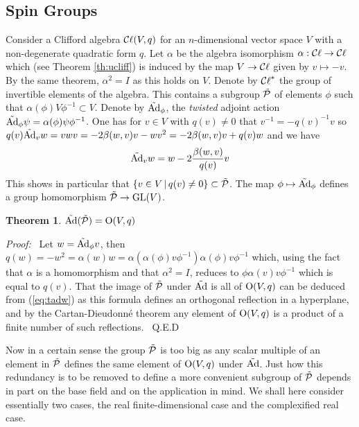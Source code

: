 \documentclass[12pt,titlepage]{article}
\def\cC{{\cal C}}
\def\cP{{\cal P}}
\def\Ad{\hbox{Ad}}
\def\Cl{{\cC\ell}}
\def\GL{\hbox{GL}}
\def\O{\hbox{O}}
\newtheorem{theorem}{Theorem}
\newenvironment{proof}{{\em Proof:\/}\ }{\ Q.E.D}
\begin{document}
\subsection{Spin Groups}\label{sec:spingroups}%

Consider a Clifford algebra \(\Cl(V,q)\) for an \(n\)-dimensional vector
space \(V\) with a non-degenerate quadratic form \(q\). 
Let \(\alpha\) be the algebra isomorphism \(\alpha:\Cl \to
\Cl\)
\index{\(\alpha\)}%
which (see Theorem \ref{th:ucliff})
is induced by the map \(V\to \Cl\) given by
\(v\mapsto -v\).
By the same theorem, \(\alpha^2=I\)
as this holds on \(V\). 
Denote by \(\Cl^*\) the
group of invertible elements of the
algebra. This contains a subgroup \(\tilde\cP\) of elements \(\phi\) such
that
\(\alpha(\phi)V\phi^{-1}\subset V\). Denote by \(\tilde{\Ad}_\phi\), the
{\em twisted\/} adjoint action
%
\(\tilde{\Ad}_\phi\psi=\alpha(\phi)\psi\phi^{-1}\). One has for \(v\in
V\) with \(q(v)\neq 0\) that \(v^{-1}= -q(v)^{-1}v\) so
\(q(v)\tilde{\Ad}_vw=
 vwv= -2\beta(w,v)v -wv^2 = -2\beta(w,v)v +q(v)w\) and we have
\begin{equation}\label{eq:tadw}%
\tilde{\Ad}_vw=  w-2\frac{\beta(w,v)}{q(v)}v
\end{equation}%
This shows in particular that \(\{v\in V\,|\,q(v)\neq 0\}\subset
\tilde\cP\).
The map \(\phi\mapsto\tilde{\Ad}_\phi\) defines a group homomorphism
\(\tilde\cP\to\GL(V)\).

\begin{theorem} \(\tilde{\Ad}(\tilde\cP)= \O(V,q)\)
\end{theorem}%
\begin{proof} Let \(w=\tilde{\Ad}_\phi v\), then
\(q(w) = -w^2 = \alpha(w)w=\alpha(\alpha(\phi)v\phi^{-1})
\alpha(\phi)v\phi^{-1}\) which, using the fact that  \(\alpha\)
is a homomorphism and that \(\alpha^2=I\),
reduces to \(\phi\alpha(v)v\phi^{-1}\) which is equal to \(q(v)\).
That the image of \(\tilde \cP\) under \(\tilde{\Ad}\) is all of
\(\O(V,q)\) can be deduced from (\ref{eq:tadw}) as this formula defines
an orthogonal reflection in a hyperplane, and by the
Cartan-Dieudonn\'e theorem any
element of \(\O(V,q)\) is a product of a finite number of such reflections.
\end{proof}%

Now in a certain sense the group \(\tilde\cP\) is too big as any scalar
multiple of an element in \(\tilde\cP\) defines the same element of
\(\O(V,q)\)
under \(\tilde{\Ad}\). Just how this redundancy is to be removed to define
a more convenient subgroup of \(\tilde\cP\) depends in part on the base
field and on the application in mind. We shall here consider essentially
two cases, the real finite-dimensional case and the complexified real
case.
\end{document}
